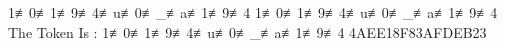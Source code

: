 1≢0≢1≢9≢4≢u≢0≢_≢a≢1≢9≢4
1≢0≢1≢9≢4≢u≢0≢_≢a≢1≢9≢4                                 
The Token Is : 1≢0≢1≢9≢4≢u≢0≢_≢a≢1≢9≢4
4AEE18F83AFDEB23
